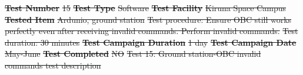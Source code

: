 \documentclass[a4paper,12pt,twoside]{article}
\providecommand{\DIFdeltex}[1]{{\protect\color{red}\sout{#1}}}                      %
\providecommand{\DIFdelend}{} %
\providecommand{\DIFdelFL}[1]{\DIFdel{#1}} %
\providecommand{\DIFdel}[1]{\texorpdfstring{\DIFdeltex{#1}}{}} %
\DeclareRobustCommand{\DIFdelend}{\DIFOaddend \let\includegraphics\DIFOincludegraphics} %
\begin{document}
\textbf{\DIFdelFL{Test Number}} %
\DIFdelFL{15 }%
\textbf{\DIFdelFL{Test Type}} %
\DIFdelFL{Software }%
\textbf{\DIFdelFL{Test Facility}} %
\DIFdelFL{Kiruna Space Campus }%
\textbf{\DIFdelFL{Tested Item}} %
\DIFdelFL{Ardunio, ground station }%
\DIFdelFL{Test procedure: Ensure OBC still works perfectly even after receiving invalid commands. Perform invalid commands.}%
\DIFdelFL{Test duration: 30 minutes}%
\textbf{\DIFdelFL{Test Campaign Duration}} %
\DIFdelFL{1 day }%
\textbf{\DIFdelFL{Test Campaign Date}} %
\DIFdelFL{May-June }%
\textbf{\DIFdelFL{Test Completed}} %
\DIFdelFL{NO }%
{%
\DIFdelFL{Test 15: Ground station-OBC invalid commands test description}}

\DIFdelend %
\renewcommand\thempfootnote{\arabic{mpfootnote}}
\end{document}
